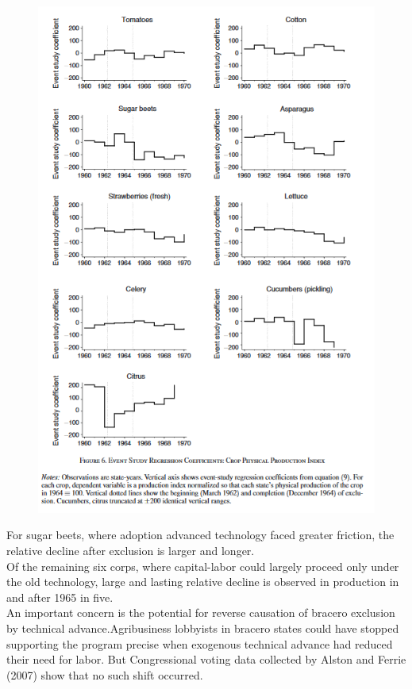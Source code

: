 \documentclass[../root]{subfiles}
\begin{document}
    \begin{figure}
        \centering
        \includegraphics[width = \linewidth]{0731sugiyama/Figure6.png}
        \label{fig:my_label}
    \end{figure}
    For sugar beets, where adoption advanced technology faced greater friction, the relative decline after exclusion is larger and longer. \\
    Of the remaining six corps, where capital-labor could largely proceed only under the old technology, large and lasting relative decline is observed in production in and after 1965 in five.  \\
    An important concern is the potential for reverse causation of bracero exclusion by technical advance.Agribusiness lobbyists in bracero states could have stopped supporting the program precise when exogenous technical advance had reduced their need for labor.  But Congressional voting data collected by Alston and Ferrie (2007) show that no such shift occurred.
    
\end{document}
